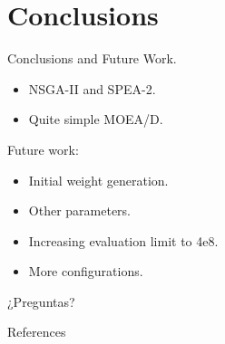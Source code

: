 \documentclass[12pt]{beamer}
\begin{document}
\section{Conclusions}
\begin{frame}[fragile]{Conclusions and Future Work.}
\begin{itemize}
    \item NSGA-II and SPEA-2.
    \item Quite simple MOEA/D.
\end{itemize}
Future work:
\begin{itemize}
    \item Initial weight generation.
    \item Other parameters.
    \item Increasing evaluation limit to 4e8.
    \item More configurations.
\end{itemize}
\end{frame}

{
\begin{frame}[standout]
  ¿Preguntas?
\end{frame}
}

\begin{frame}[allowframebreaks]{References}

  


\end{frame}
\end{document}
